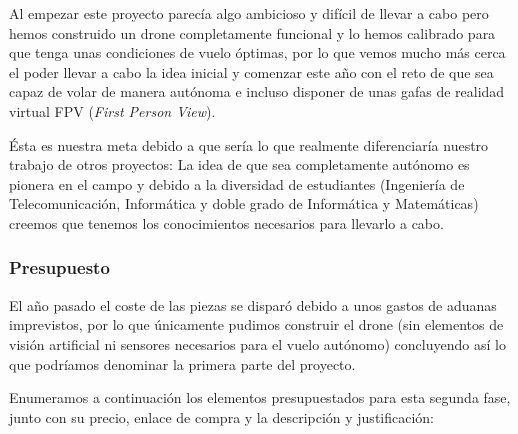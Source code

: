 \documentclass[12pt,twoside]{report}
\begin{document}
Al empezar este proyecto parecía algo ambicioso y difícil de llevar a cabo pero hemos construido un drone completamente funcional y lo hemos calibrado para que tenga unas condiciones de vuelo óptimas, por lo que vemos mucho más cerca el poder llevar a cabo la idea inicial y comenzar este año con el reto de que sea capaz de volar de manera autónoma e incluso disponer de unas gafas de realidad virtual FPV (\emph{First Person View}).

Ésta es nuestra meta debido a que sería lo que realmente diferenciaría nuestro trabajo de otros proyectos: La idea de que sea completamente autónomo es pionera en el campo y debido a la diversidad de estudiantes (Ingeniería de Telecomunicación, Informática y doble grado de Informática y Matemáticas) creemos que tenemos los conocimientos necesarios para llevarlo a cabo.

\subsubsection{Presupuesto}
El año pasado el coste de las piezas se disparó debido a unos gastos de aduanas imprevistos, por lo que únicamente pudimos construir el drone (sin elementos de visión artificial ni sensores necesarios para el vuelo autónomo) concluyendo así lo que podríamos denominar la primera parte del proyecto.

Enumeramos a continuación los elementos presupuestados para esta segunda fase, junto con su precio, enlace de compra y la descripción y justificación:
\end{document}
